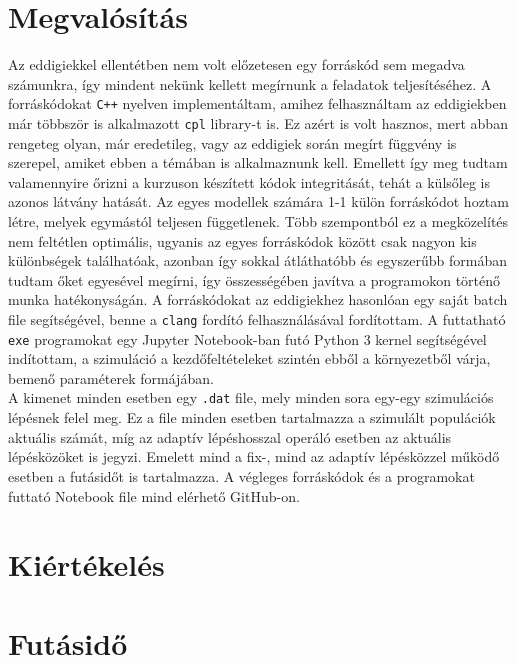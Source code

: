 \begin{multicols}{2}
\section{Megvalósítás} \label{sec:4}
Az eddigiekkel ellentétben nem volt előzetesen egy forráskód sem megadva számunkra, így mindent nekünk kellett megírnunk a feladatok teljesítéséhez. A forráskódokat \texttt{C++} nyelven implementáltam, amihez felhasználtam az eddigiekben már többször is alkalmazott \texttt{cpl} library-t is. Ez azért is volt hasznos, mert abban rengeteg olyan, már eredetileg, vagy az eddigiek során megírt függvény is szerepel, amiket ebben a témában is alkalmaznunk kell. Emellett így meg tudtam valamennyire őrizni a kurzuson készített kódok integritását, tehát a külsőleg is azonos látvány hatását. Az egyes modellek számára 1-1 külön forráskódot hoztam létre, melyek egymástól teljesen függetlenek. Több szempontból ez a megközelítés nem feltétlen optimális, ugyanis az egyes forráskódok között csak nagyon kis különbségek találhatóak, azonban így sokkal átláthatóbb és egyszerűbb formában tudtam őket egyesével megírni, így összességében javítva a programokon történő munka hatékonyságán. A forráskódokat az eddigiekhez hasonlóan egy saját batch file segítségével, benne a \texttt{clang} fordító felhasználásával fordítottam. A futtatható \texttt{exe} programokat egy Jupyter Notebook-ban futó Python 3 kernel segítségével indítottam, a szimuláció a kezdőfeltételeket szintén ebből a környezetből várja, bemenő paraméterek formájában. \\
A kimenet minden esetben egy \texttt{.dat} file, mely minden sora egy-egy szimulációs lépésnek felel meg. Ez a file minden esetben tartalmazza a szimulált populációk aktuális számát, míg az adaptív lépéshosszal operáló esetben az aktuális lépésközöket is jegyzi. Emelett mind a fix-, mind az adaptív lépésközzel működő esetben a futásidőt is tartalmazza. A végleges forráskódok és a programokat futtató Notebook file mind elérhető GitHub-on\cite{github}.

\section{Kiértékelés} \label{sec:5}


\section{Futásidő} \label{sec:6}



\end{multicols}
